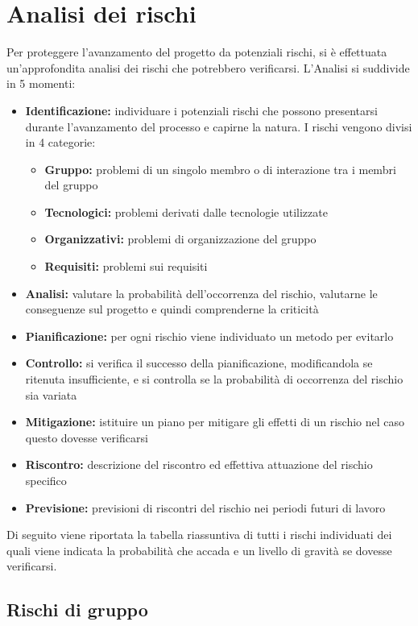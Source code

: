 \documentclass[12pt,a4paper]{article}
\begin{document}
\newpage

\section{Analisi dei rischi}\label{Analisi dei rischi}

Per proteggere l’avanzamento del progetto da potenziali rischi, si è effettuata un’approfondita analisi dei rischi che potrebbero verificarsi. L’Analisi si suddivide in 5 momenti:
\begin{itemize}
	\item \textbf{Identificazione:} individuare i potenziali rischi che possono presentarsi durante l’avanzamento del processo e capirne la natura. I rischi vengono divisi in 4 categorie:
	\begin{itemize}
		\item \textbf{Gruppo:} problemi di un singolo membro o di interazione tra i membri del gruppo
		\item \textbf{Tecnologici:} problemi derivati dalle tecnologie utilizzate
		\item \textbf{Organizzativi:} problemi di organizzazione del gruppo
		\item \textbf{Requisiti:} problemi sui requisiti
	\end{itemize}
	\item \textbf{Analisi:} valutare la probabilità dell’occorrenza del rischio, valutarne le conseguenze sul progetto e quindi comprenderne la criticità
	\item \textbf{Pianificazione:} per ogni rischio viene individuato un metodo per evitarlo
	\item \textbf{Controllo:} si verifica il successo della pianificazione, modificandola se ritenuta insufficiente, e si controlla se la probabilità di occorrenza del rischio sia variata
	\item \textbf{Mitigazione:} istituire un piano per mitigare gli effetti di un rischio nel caso questo dovesse verificarsi
	\item \textbf{Riscontro:} descrizione del riscontro ed effettiva attuazione del rischio specifico
	\item \textbf{Previsione:} previsioni di riscontri del rischio nei periodi futuri di lavoro
\end{itemize}
Di seguito viene riportata la tabella riassuntiva di tutti i rischi individuati dei quali viene indicata la probabilità che accada e un livello di gravità se dovesse verificarsi.

\subsection{Rischi di gruppo}
\end{document}
